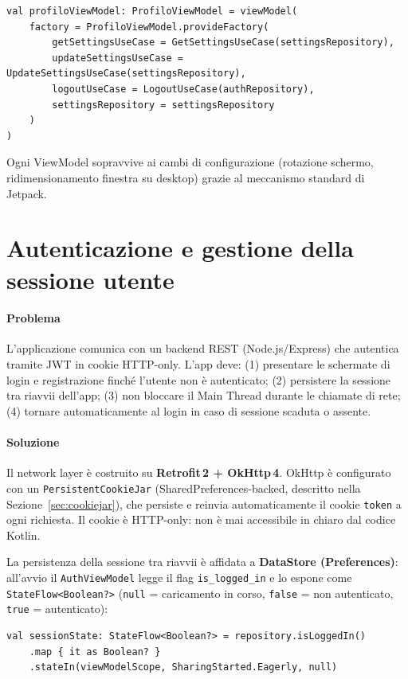 \documentclass[a4paper,12pt]{report}
\begin{document}
    \begin{lstlisting}
val profiloViewModel: ProfiloViewModel = viewModel(
    factory = ProfiloViewModel.provideFactory(
        getSettingsUseCase = GetSettingsUseCase(settingsRepository),
        updateSettingsUseCase = UpdateSettingsUseCase(settingsRepository),
        logoutUseCase = LogoutUseCase(authRepository),
        settingsRepository = settingsRepository
    )
)
    \end{lstlisting}

    Ogni ViewModel sopravvive ai cambi di configurazione (rotazione schermo,
    ridimensionamento finestra su desktop) grazie al meccanismo standard di Jetpack.

    \section{Autenticazione e gestione della sessione utente}

    \paragraph{Problema}
    L'applicazione comunica con un backend REST (Node.js/Express) che autentica tramite
    JWT in cookie HTTP-only. L'app deve: (1) presentare le schermate di login e registrazione
    finché l'utente non è autenticato; (2) persistere la sessione tra riavvii dell'app;
    (3) non bloccare il Main Thread durante le chiamate di rete; (4) tornare
    automaticamente al login in caso di sessione scaduta o assente.

    \paragraph{Soluzione}
    Il network layer è costruito su \textbf{Retrofit\,2 + OkHttp\,4}. OkHttp è configurato
    con un \texttt{PersistentCookieJar} (SharedPreferences-backed, descritto nella
    Sezione~\ref{sec:cookiejar}), che persiste e reinvia automaticamente il cookie
    \texttt{token} a ogni richiesta. Il cookie è HTTP-only: non è mai accessibile
    in chiaro dal codice Kotlin.

    La persistenza della sessione tra riavvii è affidata a \textbf{DataStore
        (Preferences)}: all'avvio il \texttt{AuthViewModel} legge il flag \texttt{is\_logged\_in}
    e lo espone come \texttt{StateFlow<Boolean?>} (\texttt{null} = caricamento in corso,
    \texttt{false} = non autenticato, \texttt{true} = autenticato):

    \begin{lstlisting}
val sessionState: StateFlow<Boolean?> = repository.isLoggedIn()
    .map { it as Boolean? }
    .stateIn(viewModelScope, SharingStarted.Eagerly, null)
    \end{lstlisting}
\end{document}
